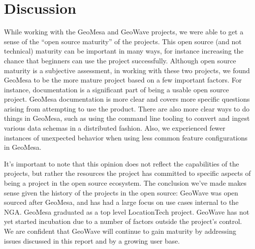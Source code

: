 \section{Discussion}
\label{sec:subjective}



While working with the GeoMesa and GeoWave projects, we were able to get a sense of the ``open source maturity'' of the projects.
This open source (and not technical) maturity can be important in many ways, for instance increasing the chance that beginners can use the project successfully.
Although open source maturity is a subjective assessment, in working with these two projects, we found GeoMesa to be the more mature project based on a few important factors.
For instance, documentation is a significant part of being a usable open source project.
GeoMesa documentation is more clear and covers more specific questions arising from attempting to use the product.
There are also more clear ways to do things in GeoMesa, such as using the command line tooling to convert and ingest various data schemas in a distributed fashion.
Also, we experienced fewer instances of unexpected behavior when using less common feature configurations in GeoMesa.

It's important to note that this opinion does not reflect the capabilities of the projects, but rather the resources the project has committed to specific aspects of being a project in the open source ecosystem.
The conclusion we've made makes sense given the history of the projects in the open source: GeoWave was open sourced after GeoMesa, and has had a large focus on use cases internal to the NGA.
GeoMesa graduated as a top level LocationTech project.
GeoWave has not yet started incubation due to a number of factors outside the project's control.
We are confident that GeoWave will continue to gain maturity by addressing issues discussed in this report and by a growing user base.
